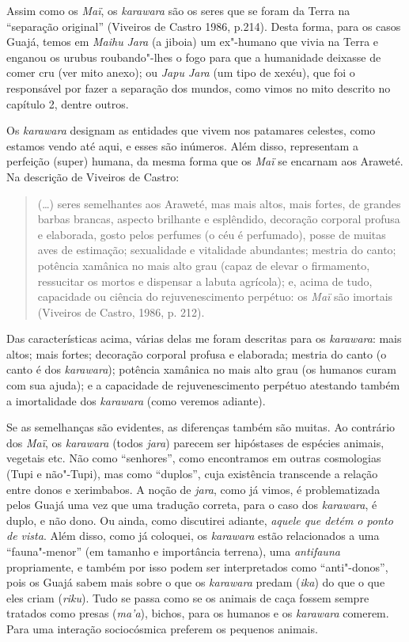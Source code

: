 Assim como os \emph{Maï}, os \emph{karawara} são os seres que se foram
da Terra na ``separação original'' (Viveiros de Castro 1986, p.214).
Desta forma, para os casos Guajá, temos em \emph{Maihu} \emph{Jara} (a
jiboia) um ex"-humano que vivia na Terra e enganou os urubus
roubando"-lhes o fogo para que a humanidade deixasse de comer cru (ver
mito anexo); ou \emph{Japu Jara} (um tipo de xexéu), que foi o
responsável por fazer a separação dos mundos, como vimos no mito
descrito no capítulo 2, dentre outros.

Os \emph{karawara} designam as entidades que vivem nos patamares
celestes, como estamos vendo até aqui, e esses são inúmeros. Além disso,
representam a perfeição (super) humana, da mesma forma que os \emph{Maï}
se encarnam aos Araweté. Na descrição de Viveiros de Castro:

\begin{quote}
(\ldots{}) seres semelhantes aos Araweté, mas mais altos, mais fortes, de
grandes barbas brancas, aspecto brilhante e esplêndido, decoração
corporal profusa e elaborada, gosto pelos perfumes (o céu é perfumado),
posse de muitas aves de estimação; sexualidade e vitalidade abundantes;
mestria do canto; potência xamânica no mais alto grau (capaz de elevar o
firmamento, ressucitar os mortos e dispensar a labuta agrícola); e,
acima de tudo, capacidade ou ciência do rejuvenescimento perpétuo: os
\emph{Maï} são imortais (Viveiros de Castro, 1986, p. 212).
\end{quote}

Das características acima, várias delas me foram descritas para os
\emph{karawara}: mais altos; mais fortes; decoração corporal profusa e
elaborada; mestria do canto (o canto é dos \emph{karawara}); potência
xamânica no mais alto grau (os humanos curam com sua ajuda); e a
capacidade de rejuvenescimento perpétuo atestando também a imortalidade
dos \emph{karawara} (como veremos adiante).

Se as semelhanças são evidentes, as diferenças também são muitas. Ao
contrário dos \emph{Maï}, os \emph{karawara} (todos \emph{jara}) parecem
ser hipóstases de espécies animais, vegetais etc. Não como ``senhores'',
como encontramos em outras cosmologias (Tupi e não"-Tupi), mas como
``duplos'', cuja existência transcende a relação entre donos e xerimbabos.
A noção de \emph{jara}, como já vimos, é problematizada pelos Guajá uma
vez que uma tradução correta, para o caso dos \emph{karawara}, é duplo,
e não dono. Ou ainda, como discutirei adiante, \emph{aquele que detém o
ponto de vista}. Além disso, como já coloquei, os \emph{karawara} estão
relacionados a uma ``fauna"-menor'' (em tamanho e importância terrena), uma
\emph{antifauna} propriamente, e também por isso podem ser interpretados
como ``anti"-donos'', pois os Guajá sabem mais sobre o que os
\emph{karawara} predam (\emph{ika}) do que o que eles criam
(\emph{riku}). Tudo se passa como se os animais de caça fossem sempre
tratados como presas (\emph{ma'a}), bichos, para os humanos e os
\emph{karawara} comerem. Para uma interação sociocósmica preferem os
pequenos animais.

